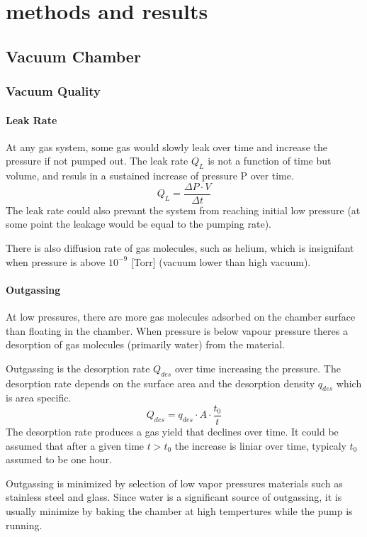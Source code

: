 \documentclass[\main/master.tex]{subfiles}
\begin{document}
\chapter{methods and results}\label{chp:example-2}
\section{Vacuum Chamber}
\subsection{Vacuum Quality}
\subsubsection{Leak Rate}
At any gas system, some gas would slowly leak over time and increase the pressure if not pumped out. The leak rate $Q_L$ is not a function of time but volume, and resuls in a sustained increase of pressure P over time.
\begin{equation}
Q_L = \frac{\Delta P\cdot V}{\Delta t}  \label{eqn:energy-mass-equivalence-relation}
\end{equation}
The leak rate could also prevant the system from reaching initial low pressure (at some point the leakage would be equal to the pumping rate).
\par
There is also diffusion rate of gas molecules, such as helium, which is insignifant when pressure is above $10^{-9}$ [Torr] (vacuum lower than high vacuum). 

\subsubsection{Outgassing}
At low pressures, there are more gas molecules adsorbed on the chamber surface than floating in the chamber. When pressure is below vapour pressure theres a desorption of gas molecules (primarily water) from the material.
\par
Outgassing is the desorption rate $Q_{des}$ over time increasing the pressure. The desorption rate depends on the surface area and the desorption density $q_{des}$ which is area specific. 
\begin{equation}
Q_{des} = q_{des}\cdot A\cdot\frac{t_0}{t}  \label{eqn:energy-mass-equivalence-relation}
\end{equation}
The desorption rate produces a gas yield that declines over time. It could be assumed that after a given time $t>t_0$ the increase is liniar over time, typicaly $t_0$ assumed to be one hour.
\par
Outgassing is minimized by selection of low vapor pressures materials such as stainless steel and glass. Since water is a significant source of outgassing, it is usually minimize by baking the chamber at high tempertures while the pump is running.
\end{document}

